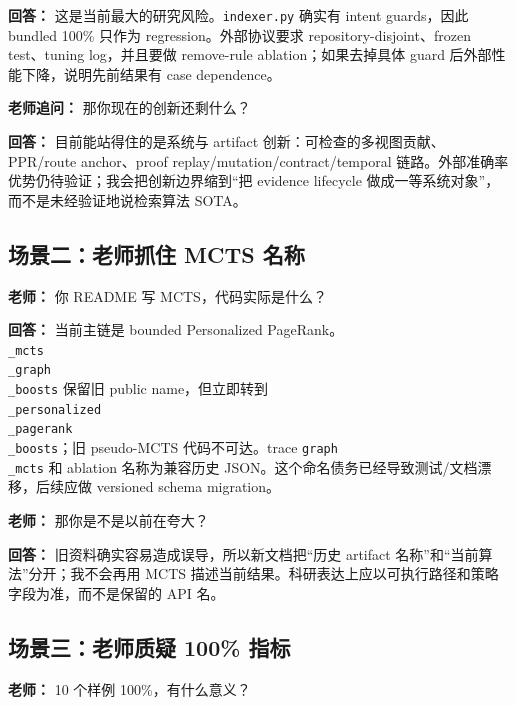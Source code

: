 \documentclass[UTF8,12pt,openany]{ctexbook}
\begin{document}
\textbf{回答：} 这是当前最大的研究风险。\texttt{indexer.py} 确实有 intent guards，因此 bundled 100\% 只作为 regression。外部协议要求 repository-disjoint、frozen test、tuning log，并且要做 remove-rule ablation；如果去掉具体 guard 后外部性能下降，说明先前结果有 case dependence。\par

\textbf{老师追问：} 那你现在的创新还剩什么？\par

\textbf{回答：} 目前能站得住的是系统与 artifact 创新：可检查的多视图贡献、PPR/route anchor、proof replay/mutation/contract/temporal 链路。外部准确率优势仍待验证；我会把创新边界缩到“把 evidence lifecycle 做成一等系统对象”，而不是未经验证地说检索算法 SOTA。\par

\subsection{场景二：老师抓住 MCTS 名称}

\textbf{老师：} 你 README 写 MCTS，代码实际是什么？\par

\textbf{回答：} 当前主链是 bounded Personalized PageRank。\texttt{\\_mcts\\_graph\\_boosts} 保留旧 public name，但立即转到 \texttt{\\_personalized\\_pagerank\\_boosts}；旧 pseudo-MCTS 代码不可达。trace \texttt{graph\\_mcts} 和 ablation 名称为兼容历史 JSON。这个命名债务已经导致测试/文档漂移，后续应做 versioned schema migration。\par

\textbf{老师：} 那你是不是以前在夸大？\par

\textbf{回答：} 旧资料确实容易造成误导，所以新文档把“历史 artifact 名称”和“当前算法”分开；我不会再用 MCTS 描述当前结果。科研表达上应以可执行路径和策略字段为准，而不是保留的 API 名。\par

\subsection{场景三：老师质疑 100\% 指标}

\textbf{老师：} 10 个样例 100\%，有什么意义？\par
\end{document}
